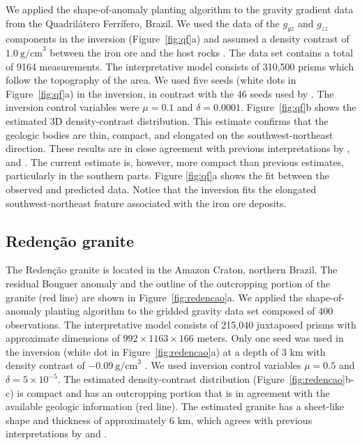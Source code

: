 \documentclass{segabs}
\begin{document}
\begin{sloppypar}
We applied the shape-of-anomaly planting algorithm to the gravity gradient
data from the Quadril\'atero Ferr\'ifero, Brazil.
We used the data of the $g_{yz}$ and $g_{zz}$ components in the inversion
(Figure~\ref{fig:qf}a) and assumed a density contrast of $1.0\ \mathrm{g/cm}^3$
between the iron ore and the host rocks \citep{Carlos2011, Uieda2011}.
The data set contains a total of 9164 measurements.
The interpretative model consists of 310,500 prisms which follow the topography
of the area.
We used five seeds (white dots in Figure~\ref{fig:qf}a) in the inversion, in
contrast with the 46 seeds used by \citet{Uieda2011}.
The inversion control variables were $\mu = 0.1$ and $\delta = 0.0001$.
Figure~\ref{fig:qf}b shows the estimated 3D density-contrast distribution.
This estimate confirms that the geologic bodies are thin, compact, and
elongated on the southwest-northeast direction.
These results are in close agreement with previous interpretations by
\citet{Martinez2010}, \citet{Carlos2011} and \citet{Uieda2011}.
The current estimate is, however, more compact than previous estimates,
particularly in the southern parts.
Figure \ref{fig:qf}a shows the fit between the observed and predicted data.
Notice that the inversion fits the elongated southwest-northeast feature
associated with the iron ore deposits.
\end{sloppypar}


\subsection{Reden\c{c}\~ao granite}

\begin{sloppypar}
The Reden\c{c}\~ao granite is located in the Amazon Craton, northern Brazil.
The residual Bouguer anomaly and the outline of the outcropping portion of the
granite (red line) are shown in Figure~\ref{fig:redencao}a.
We applied the shape-of-anomaly planting algorithm to the gridded gravity
data set composed of 400 observations.
The interpretative model consists of 215,040 juxtaposed prisms with approximate
dimensions of $992 \times 1163 \times 166$ meters.
Only one seed was used in the inversion (white dot in
Figure~\ref{fig:redencao}a) at a depth of 3 km with density contrast of
$-0.09\ \mathrm{g/cm}^3$ \citep{Oliveira2008}.
We used inversion control variables $\mu = 0.5$ and $\delta = 5 \times 10^{-5}$.
The estimated density-contrast distribution (Figure~\ref{fig:redencao}b-c) is
compact and has an outcropping portion that is in agreement with the available
geologic information (red line).
The estimated granite has a sheet-like shape and thickness of approximately
6 km, which agrees with previous interpretations by \citet{SilvaDias2007a} and
\citet{Oliveira2008}.
\end{sloppypar}
\end{document}
